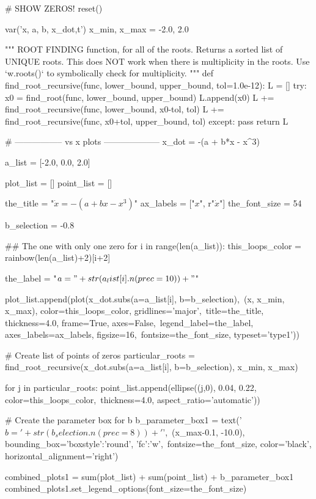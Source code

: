 \documentclass[10pt]{beamer}
\begin{document}
\begin{sagesilent} # SHOW ZEROS!
	reset()

	var('x, a, b, x_dot,t')
	x_min, x_max = -2.0, 2.0

	"""
		ROOT FINDING function, for all of the roots.
		Returns a sorted list of UNIQUE roots. This does NOT work when there
		is multiplicity in the roots. Use `w.roots()` to symbolically check
		for multiplicity.
	"""
	def find_root_recursive(func, lower_bound, upper_bound, tol=1.0e-12):
	    L = []
	    try:
	    	x0 = find_root(func, lower_bound, upper_bound)
	    	L.append(x0)
	    	L += find_root_recursive(func, lower_bound, x0-tol, tol)
	    	L += find_root_recursive(func, x0+tol, upper_bound, tol)
	    except:
	    	pass
	    return L

	# -----------------  vs x plots --------------------
	x_dot = -(a + b*x - x^3)

	a_list = [-2.0, 0.0, 2.0]

	plot_list = []
	point_list = []

	the_title = "$\dot{x} = -(a + bx - x^3)$"
	ax_labels = ["$x$", r"$\dot{x}$"]
	the_font_size = 54

	b_selection = -0.8

	## The one with only one zero
	for i in range(len(a_list)):
	    this_loops_color = rainbow(len(a_list)+2)[i+2]

	    the_label = "$a = " + str(a_list[i].n(prec=10)) + "$"

	    plot_list.append(plot(x_dot.subs(a=a_list[i], b=b_selection),\
	    		(x, x_min, x_max), color=this_loops_color, gridlines='major',\
	    		title=the_title, thickness=4.0, frame=True, axes=False,\
	    		legend_label=the_label, axes_labels=ax_labels, figsize=16,\
	    		fontsize=the_font_size, typeset='type1'))

	    # Create list of points of zeros
	    particular_roots = find_root_recursive(x_dot.subs(a=a_list[i], b=b_selection), x_min, x_max)

	    for j in particular_roots:
	    	point_list.append(ellipse((j,0), 0.04, 0.22, color=this_loops_color,\
	    			thickness=4.0, aspect_ratio='automatic'))

	# Create the parameter box for b
	b_parameter_box1 = text('$b = ' + str(b_selection.n(prec=8)) + '$',\
			(x_max-0.1, -10.0), bounding_box={'boxstyle':'round', 'fc':'w'},\
			fontsize=the_font_size, color='black', horizontal_alignment='right')

	combined_plots1 = sum(plot_list) + sum(point_list) + b_parameter_box1
	combined_plots1.set_legend_options(font_size=the_font_size)



\end{sagesilent}
\end{document}
